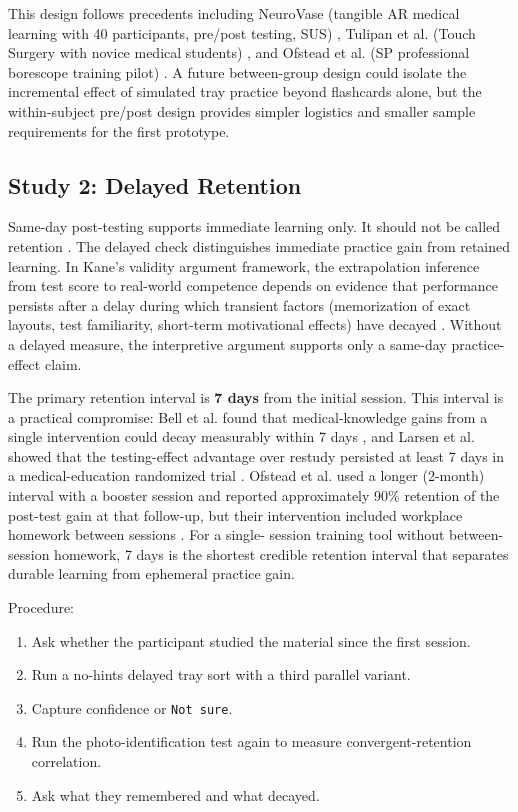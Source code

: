 \documentclass[10pt,a4paper]{article}
\begin{document}
This design follows precedents including NeuroVase (tangible AR medical learning with 40 participants, pre/post testing, SUS)
\cite{jahani-et-al-2026-neurovase}, Tulipan et al. (Touch Surgery with novice medical students)
\cite{tulipan-et-al-2019}, and Ofstead et al. (SP professional borescope training pilot)
\cite{ofstead-et-al-2023}.
A future between-group design could isolate the incremental effect of simulated tray
practice beyond flashcards alone, but the within-subject pre/post design provides
simpler logistics and smaller sample requirements for the first prototype.
\subsection{Study 2: Delayed Retention}
\label{sec:study-2}

Same-day post-testing supports immediate learning only. It should not be called
retention \cite{bell-et-al-2008}. The delayed check distinguishes immediate
practice gain from retained learning. In Kane's validity argument framework, the
extrapolation inference from test score to real-world competence depends on
evidence that performance persists after a delay during which transient factors
(memorization of exact layouts, test familiarity, short-term motivational
effects) have decayed \cite{kane-validity-2013}. Without a delayed measure, the
interpretive argument supports only a same-day practice-effect claim.

The primary retention interval is \textbf{7 days} from the initial session. This
interval is a practical compromise: Bell et al. found that medical-knowledge
gains from a single intervention could decay measurably within 7 days
\cite{bell-et-al-2008}, and Larsen et al. showed that the testing-effect
advantage over restudy persisted at least 7 days in a medical-education
randomized trial \cite{larsen-et-al-2009}. Ofstead et al. used a longer
(2-month) interval with a booster session and reported approximately
90\% retention of the post-test gain at that follow-up, but their intervention
included workplace homework between sessions \cite{ofstead-et-al-2023}. For a single-
session training tool without between-session homework, 7 days is the shortest
credible retention interval that separates durable learning from ephemeral
practice gain.

Procedure:
\begin{enumerate}
  \item Ask whether the participant studied the material since the first session.
  \item Run a no-hints delayed tray sort with a third parallel variant.
  \item Capture confidence or \texttt{Not sure}.
  \item Run the photo-identification test again to measure convergent-retention correlation.
  \item Ask what they remembered and what decayed.
\end{enumerate}
\end{document}
